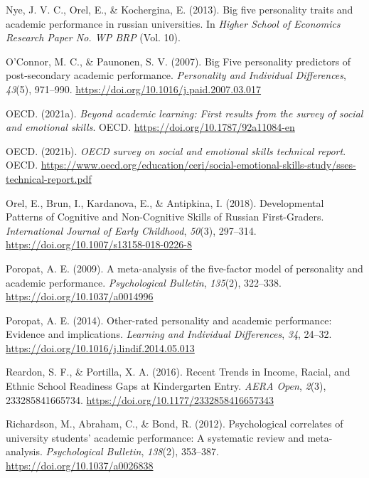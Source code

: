 \documentclass{article}
\newlength{\cslhangindent}
\newlength{\cslentryspacingunit} %
\newenvironment{CSLReferences}[2] %
 {%
  \setlength{\parindent}{0pt}
  \ifodd #1
  \let\oldpar\par
  \def\par{\hangindent=\cslhangindent\oldpar}
  \fi
  \setlength{\parskip}{#2\cslentryspacingunit}
 }%
 {}
\begin{document}
\begin{CSLReferences}{1}{0}
\leavevmode{}%
Nye, J. V. C., Orel, E., \& Kochergina, E. (2013). Big five personality
traits and academic performance in russian universities. In \emph{Higher
School of Economics Research Paper No. WP BRP} (Vol. 10).

\leavevmode{}%
O'Connor, M. C., \& Paunonen, S. V. (2007). Big Five personality
predictors of post-secondary academic performance. \emph{Personality and
Individual Differences}, \emph{43}(5), 971--990.
\url{https://doi.org/10.1016/j.paid.2007.03.017}

\leavevmode{}%
OECD. (2021a). \emph{Beyond academic learning: First results from the
survey of social and emotional skills}. OECD.
\url{https://doi.org/10.1787/92a11084-en}

\leavevmode{}%
OECD. (2021b). \emph{OECD survey on social and emotional skills
technical report}. OECD.
\url{https://www.oecd.org/education/ceri/social-emotional-skills-study/sses-technical-report.pdf}

\leavevmode{}%
Orel, E., Brun, I., Kardanova, E., \& Antipkina, I. (2018).
Developmental Patterns of Cognitive and Non-Cognitive Skills of Russian
First-Graders. \emph{International Journal of Early Childhood},
\emph{50}(3), 297--314. \url{https://doi.org/10.1007/s13158-018-0226-8}

\leavevmode{}%
Poropat, A. E. (2009). A meta-analysis of the five-factor model of
personality and academic performance. \emph{Psychological Bulletin},
\emph{135}(2), 322--338. \url{https://doi.org/10.1037/a0014996}

\leavevmode{}%
Poropat, A. E. (2014). Other-rated personality and academic performance:
Evidence and implications. \emph{Learning and Individual Differences},
\emph{34}, 24--32. \url{https://doi.org/10.1016/j.lindif.2014.05.013}

\leavevmode{}%
Reardon, S. F., \& Portilla, X. A. (2016). Recent Trends in Income,
Racial, and Ethnic School Readiness Gaps at Kindergarten Entry.
\emph{AERA Open}, \emph{2}(3), 233285841665734.
\url{https://doi.org/10.1177/2332858416657343}

\leavevmode{}%
Richardson, M., Abraham, C., \& Bond, R. (2012). Psychological
correlates of university students' academic performance: A systematic
review and meta-analysis. \emph{Psychological Bulletin}, \emph{138}(2),
353--387. \url{https://doi.org/10.1037/a0026838}


\end{CSLReferences}
\end{document}
